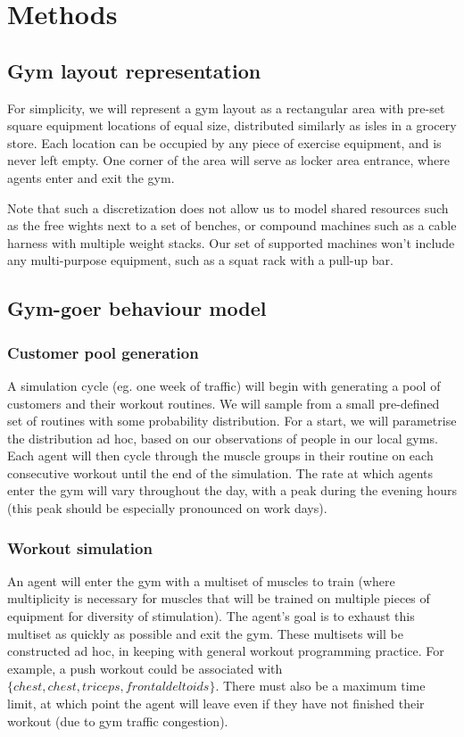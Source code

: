 \documentclass[9pt]{pnas-new}
\begin{document}
\section*{Methods}

\subsection*{Gym layout representation}
For simplicity, we will represent a gym layout as a rectangular area with pre-set square equipment locations of equal size, distributed similarly as isles in a grocery store.
Each location can be occupied by any piece of exercise equipment, and is never left empty.
One corner of the area will serve as locker area entrance, where agents enter and exit the gym.

Note that such a discretization does not allow us to model shared resources such as the free wights next to a set of benches, or compound machines such as a cable harness with multiple weight stacks.
Our set of supported machines won't include any multi-purpose equipment, such as a squat rack with a pull-up bar.

\subsection*{Gym-goer behaviour model}

\subsubsection*{Customer pool generation}
A simulation cycle (eg. one week of traffic) will begin with generating a pool of customers and their workout routines. We will sample from a small pre-defined set of routines with some probability distribution. For a start, we will parametrise the distribution ad hoc, based on our observations of people in our local gyms.
Each agent will then cycle through the muscle groups in their routine on each consecutive workout until the end of the simulation.
The rate at which agents enter the gym will vary throughout the day, with a peak during the evening hours (this peak should be especially pronounced on work days).

\subsubsection*{Workout simulation}
An agent will enter the gym with a multiset of muscles to train (where multiplicity is necessary for muscles that will be trained on multiple pieces of equipment for diversity of stimulation). The agent's goal is to exhaust this multiset as quickly as possible and exit the gym.
These multisets will be constructed ad hoc, in keeping with general workout programming practice. For example, a push workout could be associated with $\{chest, chest, triceps, frontal deltoids\}$.
There must also be a maximum time limit, at which point the agent will leave even if they have not finished their workout (due to gym traffic congestion).
\end{document}
